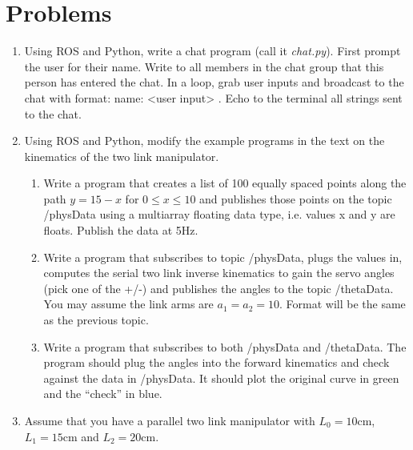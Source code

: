 \hypertarget{problems}{%
\section{Problems}\label{problems}}

\begin{enumerate}
\tightlist
\item
  Using ROS and Python, write a chat program (call it \emph{chat.py}).
  First prompt the user for their name. Write to all members in the chat
  group that this person has entered the chat. In a loop, grab user
  inputs and broadcast to the chat with format: name: \textless user
  input\textgreater{} . Echo to the terminal all strings sent to the
  chat.
\item
  Using ROS and Python, modify the example programs in the text on the
  kinematics of the two link manipulator.

  \begin{enumerate}
  \tightlist
  \item
    Write a program that creates a list of 100 equally spaced points
    along the path \(y = 15 -  x\) for \(0 \leq x \leq 10\) and
    publishes those points on the topic /physData using a multiarray
    floating data type, i.e. values x and y are floats. Publish the data
    at 5Hz.
  \item
    Write a program that subscribes to topic /physData, plugs the values
    in, computes the serial two link inverse kinematics to gain the
    servo angles (pick one of the +/-) and publishes the angles to the
    topic /thetaData. You may assume the link arms are \(a_1=a_2 = 10\).
    Format will be the same as the previous topic.
  \item
    Write a program that subscribes to both /physData and /thetaData.
    The program should plug the angles into the forward kinematics and
    check against the data in /physData. It should plot the original
    curve in green and the ``check'' in blue.
  \end{enumerate}
\item
  Assume that you have a parallel two link manipulator with
  \(L_0 = 10\)cm, \(L_1 = 15\)cm and \(L_2 = 20\)cm.


\end{enumerate}
